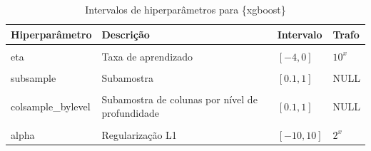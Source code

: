 \begin{apendicesenv}
\begin{table}
  \caption{\label{tab:tbl-hip-xgboost}Intervalos de hiperparâmetros para \{xgboost\}}
  \centering
  \begin{tabular}[t]{llll}
  \toprule
  Hiperparâmetro & Descrição & Intervalo & Trafo\\
  \midrule
  \cellcolor{gray!6}{nrounds} & \cellcolor{gray!6}{Número de iterações} & \cellcolor{gray!6}{$[1, 5000]$} & \cellcolor{gray!6}{NULL}\\
  eta & Taxa de aprendizado & $[-4, 0]$ & $10^x$\\
  \cellcolor{gray!6}{max\_depth} & \cellcolor{gray!6}{Profundidade máxima} & \cellcolor{gray!6}{$[1, 20]$} & \cellcolor{gray!6}{NULL}\\
  subsample & Subamostra & $[0.1, 1]$ & NULL\\
  \cellcolor{gray!6}{colsample\_bytree} & \cellcolor{gray!6}{Subamostra de colunas para uma árvore} & \cellcolor{gray!6}{$[0.1, 1]$} & \cellcolor{gray!6}{NULL}\\
  \addlinespace
  colsample\_bylevel & Subamostra de colunas por nível de profundidade & $[0.1, 1]$ & NULL\\
  \cellcolor{gray!6}{lambda} & \cellcolor{gray!6}{Regularização L2} & \cellcolor{gray!6}{$[-10, 10]$} & \cellcolor{gray!6}{$2^x$}\\
  alpha & Regularização L1 & $[-10, 10]$ & $2^x$\\
  \bottomrule
  \end{tabular}
\end{table}

\begin{table}


\end{table}
\end{apendicesenv}

